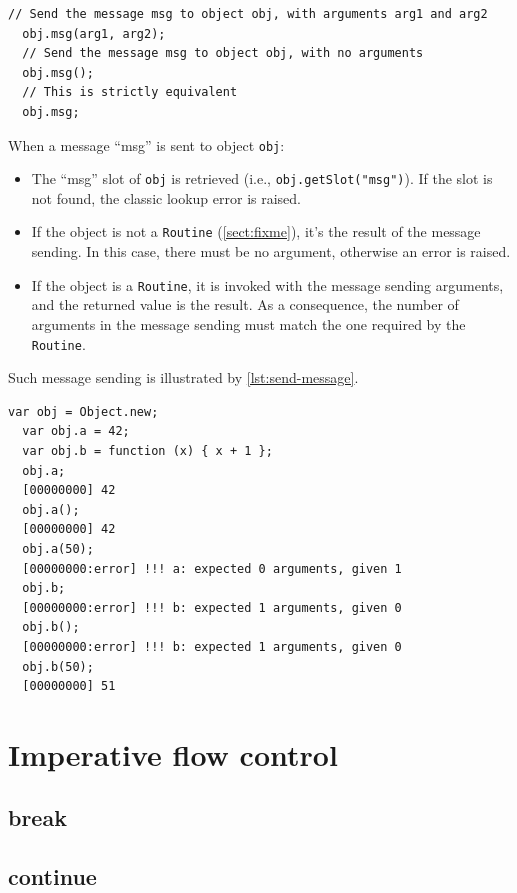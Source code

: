 \documentclass[openright,twoside,12pt]{report}
\newcommand   {\floatpos}          {htbp}
\newcommand{\lst}[1]{\autoref{lst:#1}}
\newcommand{\sect}[1]{\autoref{sect:#1}}
\begin{document}
\begin{lstlisting}[caption=Sending messages, label=lst:messages,
  float=\floatpos]
  // Send the message msg to object obj, with arguments arg1 and arg2
  obj.msg(arg1, arg2);
  // Send the message msg to object obj, with no arguments
  obj.msg();
  // This is strictly equivalent
  obj.msg;
\end{lstlisting}

When a message ``msg'' is sent to object \lstinline|obj|:

\begin{itemize}
\item The ``msg'' slot of \lstinline|obj| is retrieved (i.e.,
  \lstinline|obj.getSlot("msg")|). If the slot is not found, the
  classic lookup error is raised.
\item If the object is not a \lstinline|Routine| (\sect{fixme}), it's
  the result of the message sending. In this case, there must be no
  argument, otherwise an error is raised.
\item If the object is a \lstinline|Routine|, it is invoked with the
  message sending arguments, and the returned value is the result. As
  a consequence, the number of arguments in the message sending must
  match the one required by the \lstinline|Routine|.
\end{itemize}

Such message sending is illustrated by \lst{send-message}.

\begin{lstlisting}[caption=Sending messages, label=lst:send-message,
  float=\floatpos]
  var obj = Object.new;
  var obj.a = 42;
  var obj.b = function (x) { x + 1 };
  obj.a;
  [00000000] 42
  obj.a();
  [00000000] 42
  obj.a(50);
  [00000000:error] !!! a: expected 0 arguments, given 1
  obj.b;
  [00000000:error] !!! b: expected 1 arguments, given 0
  obj.b();
  [00000000:error] !!! b: expected 1 arguments, given 0
  obj.b(50);
  [00000000] 51
\end{lstlisting}

\FloatBarrier
\section{Imperative flow control}

\subsection{break}
\subsection{continue}
\end{document}
